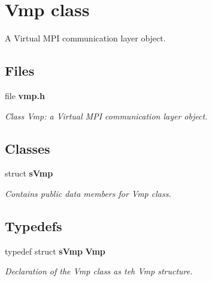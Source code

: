 \section{Vmp class}
\label{a00025}


A Virtual M\-P\-I communication layer object.  


\subsection*{Files}
\begin{DoxyCompactItemize}
\item 
file {\bf vmp.\-h}
\begin{DoxyCompactList}\small\item\em Class Vmp\-: a Virtual M\-P\-I communication layer object. \end{DoxyCompactList}\end{DoxyCompactItemize}
\subsection*{Classes}
\begin{DoxyCompactItemize}
\item 
struct {\bf s\-Vmp}
\begin{DoxyCompactList}\small\item\em Contains public data members for Vmp class. \end{DoxyCompactList}\end{DoxyCompactItemize}
\subsection*{Typedefs}
\begin{DoxyCompactItemize}
\item 
typedef struct {\bf s\-Vmp} {\bf Vmp}
\begin{DoxyCompactList}\small\item\em Declaration of the Vmp class as teh Vmp structure. \end{DoxyCompactList}\end{DoxyCompactItemize}
